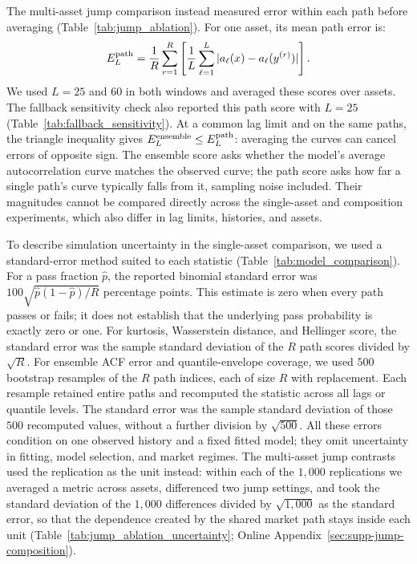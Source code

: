 The multi-asset jump comparison instead measured error within each
path before averaging (Table~\ref{tab:jump_ablation}). For one
asset, its mean path error is:
\begin{equation}
 E^{\rm path}_L=\frac{1}{R}\sum_{r=1}^{R}
       \left[\frac{1}{L}\sum_{\ell=1}^{L}
       |a_\ell(x)-a_\ell(y^{(r)})|\right].
 \label{eq:acf-path-error}
\end{equation}
We used $L=25$ and $60$ in both windows and averaged these scores
over assets. The fallback sensitivity check also reported this path
score with $L=25$ (Table~\ref{tab:fallback_sensitivity}). At a common
lag limit and on the same paths, the triangle inequality gives
$E^{\rm ensemble}_L\le E^{\rm path}_L$: averaging the curves can
cancel errors of opposite sign. The ensemble score asks whether the
model's average autocorrelation curve matches the observed curve; the
path score asks how far a single path's curve typically falls from
it, sampling noise included. Their magnitudes
cannot be compared directly across the single-asset and composition
experiments, which also differ in lag limits, histories, and assets.

To describe simulation uncertainty in the single-asset comparison,
we used a standard-error method suited to each statistic
(Table~\ref{tab:model_comparison}). For a pass fraction $\hat p$,
the reported binomial standard error was
$100\sqrt{\hat p(1-\hat p)/R}$ percentage points. This estimate is
zero when every path passes or fails; it does not establish that the
underlying pass probability is exactly zero or one. For kurtosis,
Wasserstein distance, and Hellinger score, the standard error was
the sample standard deviation of the $R$ path scores divided by
$\sqrt R$. For ensemble ACF error and quantile-envelope coverage,
we used $500$ bootstrap resamples of the $R$ path indices, each of
size $R$ with replacement. Each resample retained entire paths and
recomputed the statistic across all lags or quantile levels. The
standard error was the sample standard deviation of those $500$
recomputed values, without a further division by $\sqrt{500}$.
All these errors condition on one observed history and a fixed fitted
model; they omit uncertainty in fitting, model selection, and market
regimes. The multi-asset jump contrasts used the replication as the
unit instead: within each of the $1{,}000$ replications we averaged a
metric across assets, differenced two jump settings, and took the
standard deviation of the $1{,}000$ differences divided by
$\sqrt{1{,}000}$ as the standard error, so that the dependence created
by the shared market path stays inside each unit
(Table~\ref{tab:jump_ablation_uncertainty}; Online
Appendix~\ref{sec:supp-jump-composition}).

